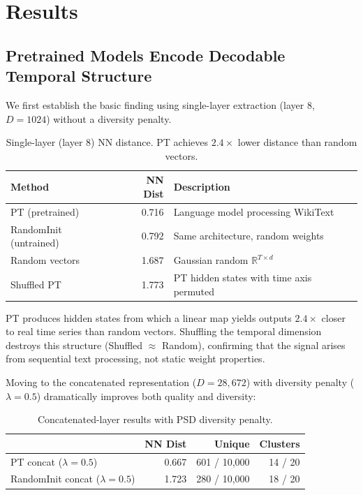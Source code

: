 \documentclass[11pt,a4paper]{article}
\newcommand{\R}{\mathbb{R}}
\begin{document}
\section{Results}

\subsection{Pretrained Models Encode Decodable Temporal Structure}

We first establish the basic finding using single-layer extraction (layer 8, $D = 1024$) without a diversity penalty.

\begin{table}[h]
\centering
\begin{tabular}{lrl}
\toprule
Method & NN Dist & Description \\
\midrule
PT (pretrained) & 0.716 & Language model processing WikiText \\
RandomInit (untrained) & 0.792 & Same architecture, random weights \\
Random vectors & 1.687 & Gaussian random $\R^{T \times d}$ \\
Shuffled PT & 1.773 & PT hidden states with time axis permuted \\
\bottomrule
\end{tabular}
\caption{Single-layer (layer 8) NN distance. PT achieves $2.4\times$ lower distance than random vectors.}
\label{tab:single-layer}
\end{table}

PT produces hidden states from which a linear map yields outputs $2.4\times$ closer to real time series than random vectors.
Shuffling the temporal dimension destroys this structure (Shuffled $\approx$ Random), confirming that the signal arises from sequential text processing, not static weight properties.

Moving to the concatenated representation ($D = 28{,}672$) with diversity penalty ($\lambda = 0.5$) dramatically improves both quality and diversity:

\begin{table}[h]
\centering
\begin{tabular}{lrrr}
\toprule
& NN Dist & Unique & Clusters \\
\midrule
PT concat ($\lambda = 0.5$) & 0.667 & 601 / 10{,}000 & 14 / 20 \\
RandomInit concat ($\lambda = 0.5$) & 1.723 & 280 / 10{,}000 & 18 / 20 \\
\bottomrule
\end{tabular}
\caption{Concatenated-layer results with PSD diversity penalty.}
\label{tab:concat}
\end{table}
\end{document}
